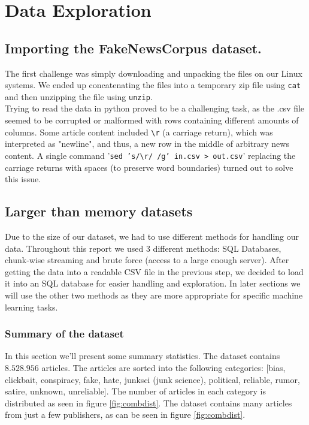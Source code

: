 \section{Data Exploration}

\subsection{Importing the FakeNewsCorpus dataset.}
The first challenge was simply downloading and unpacking the files on our Linux systems. We ended up concatenating the
files into a temporary zip file using \texttt{cat} and then unzipping the file using \texttt{unzip}. \\

Trying to read the data in python proved to be a challenging task, as the .csv file seemed to be corrupted or malformed
with rows containing different amounts of columns. Some article content included \texttt{\textbackslash r} (a carriage
return), which was interpreted as "newline", and thus, a new row in the middle of arbitrary news content. A single command '\texttt{sed 's/\textbackslash r/ /g' in.csv > out.csv}' replacing the carriage returns with spaces (to preserve word boundaries) turned out to solve this issue.\\

\subsection{Larger than memory datasets}
Due to the size of our dataset, we had to use different methods for handling our data. Throughout this report we used 3
different methods: SQL Databases, chunk-wise streaming and brute force (access
to a large enough server). After getting the data into a readable CSV file in the previous step, we decided to load it
into an SQL database for easier handling and exploration. In later sections we will use the other two methods as they
are more appropriate for specific machine learning tasks.


\subsubsection{Summary of the dataset}
In this section we'll present some summary statistics. The dataset contains $ 8.528.956 $ articles. The articles are
sorted into the following categories: [bias, clickbait, conspiracy, fake, hate, junksci (junk science), political,
reliable, rumor, satire, unknown, unreliable]. The number of articles in each category is distributed as seen in figure
\ref{fig:combdist}. The dataset contains many articles from just a few publishers, as can be seen in figure \ref{fig:combdist}.

